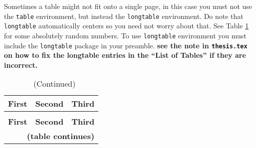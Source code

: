 Sometimes a table might not fit onto a single page, in this case you
must not use the \texttt{table} environment, but instead the
\texttt{longtable} environment.  Do note that \texttt{longtable}
automatically centers so you need not worry about that.  See Table
\ref{totallyrandom} for some absolutely random numbers.  To use
\texttt{longtable} environment you must include the \texttt{longtable}
package in your preamble. \textbf{see the note in \texttt{thesis.tex}
  on how to fix the longtable entries in the ``List of Tables'' if
  they are incorrect.}

\begin{longtable}{|l|l|l|}
  \caption{A Table of Some Totally Random Numbers} \label{totallyrandom} \\

  \hline
  \multicolumn{1}{|l|}{\textbf{First}} &
  \multicolumn{1}{l|}{\textbf{Second}} &
  \multicolumn{1}{l|}{\textbf{Third}} \\
  \hline \hline
  \endfirsthead

  \caption*{\tablename\ \thetable{} (Continued)} \\
  \hline \multicolumn{1}{|l|}{\textbf{First}} &
  \multicolumn{1}{l|}{\textbf{Second}} &
  \multicolumn{1}{l|}{\textbf{Third}} \\ \hline \hline
  \endhead

  \multicolumn{3}{r}{\textbf{(table continues)}}
  \endfoot

  \hline
  \endlastfoot


\end{longtable}
